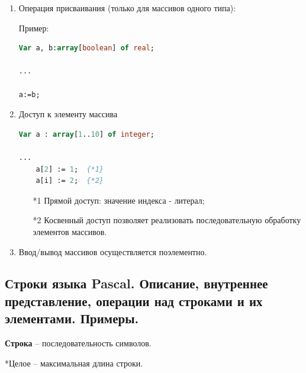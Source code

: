 \begin{enumerate}
\item Операция присваивания (только для массивов одного типа):

Пример:

\begin{lstlisting}[language=Pascal]
Var a, b:array[boolean] of real;

... 

a:=b; 
\end{lstlisting}

\item Доступ к элементу массива

\begin{lstlisting}[language=Pascal]
Var a : array[1..10] of integer;

... 
	a[2] := 1;  {*1} 
	a[i] := 2;  {*2}
\end{lstlisting}
\begin{itemize}
    \item[*1] Прямой доступ: значение индекса - литерал;

    \item[*2] Косвенный доступ позволяет реализовать последовательную обработку элементов массивов.
\end{itemize}

\item Ввод/вывод массивов осуществляется поэлементно.

\end{enumerate}





\newpage\subsection{Строки языка Pascal. Описание, внутреннее представление, операции над строками и их 
элементами. Примеры. }

\begin{myquote}
            
\end{myquote}

\noindent
{\bf{Строка}} – последовательность символов.


*Целое – максимальная длина строки.

